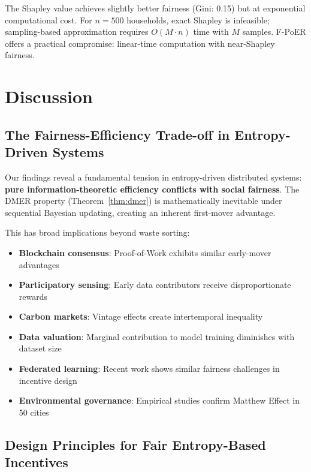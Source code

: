 \documentclass[12pt,a4paper]{article}
\begin{document}
The Shapley value achieves slightly better fairness (Gini: 0.15) but at exponential computational cost. For $n=500$ households, exact Shapley is infeasible; sampling-based approximation\cite{okhrati2021multilinear} requires $O(M \cdot n)$ time with $M$ samples. F-PoER offers a practical compromise: linear-time computation with near-Shapley fairness.

\section{Discussion}

\subsection{The Fairness-Efficiency Trade-off in Entropy-Driven Systems}

Our findings reveal a fundamental tension in entropy-driven distributed systems: \textbf{pure information-theoretic efficiency conflicts with social fairness}. The DMER property (Theorem~\ref{thm:dmer}) is mathematically inevitable under sequential Bayesian updating, creating an inherent first-mover advantage.

This has broad implications beyond waste sorting:
\begin{itemize}
    \item \textbf{Blockchain consensus}: Proof-of-Work exhibits similar early-mover advantages\cite{nakamoto2008bitcoin,wang2025blockchain}
    \item \textbf{Participatory sensing}: Early data contributors receive disproportionate rewards\cite{ganti2011mobile,zhang2025entropy}
    \item \textbf{Carbon markets}: Vintage effects create intertemporal inequality\cite{worldbank2022carbon,rodriguez2025dynamic}
    \item \textbf{Data valuation}: Marginal contribution to model training diminishes with dataset size\cite{ghorbani2019data,li2025data}
    \item \textbf{Federated learning}: Recent work shows similar fairness challenges in incentive design\cite{chen2025federated,liu2025temporal}
    \item \textbf{Environmental governance}: Empirical studies confirm Matthew Effect in 50 cities\cite{thompson2025matthew}
\end{itemize}

\subsection{Design Principles for Fair Entropy-Based Incentives}
\end{document}
